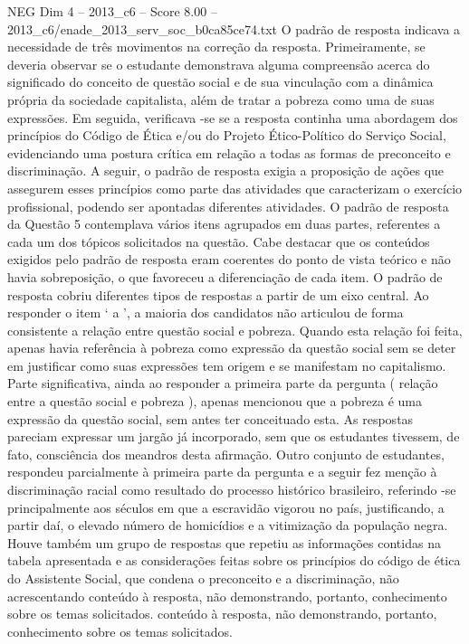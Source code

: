\begin{textsample}{NEG Dim 4 – 2013\_c6 – Score 8.00 – 2013\_c6/enade\_2013\_serv\_soc\_b0ca85ce74.txt}
O padrão de resposta indicava a necessidade de três movimentos na correção da resposta.
Primeiramente, se deveria observar se o estudante demonstrava alguma compreensão acerca do significado do conceito de questão social e de sua vinculação com a dinâmica própria da sociedade capitalista, além de tratar a pobreza como uma de suas expressões.
Em seguida, verificava -se se a resposta continha uma abordagem dos princípios do Código de Ética e/ou do Projeto Ético-Político do Serviço Social, evidenciando uma postura crítica em relação a todas as formas de preconceito e discriminação.
A seguir, o padrão de resposta exigia a proposição de ações que assegurem esses princípios como parte das atividades que caracterizam o exercício profissional, podendo ser apontadas diferentes atividades.
O padrão de resposta da Questão 5 contemplava vários itens agrupados em duas partes, referentes a cada um dos tópicos solicitados na questão.
Cabe destacar que os conteúdos exigidos pelo padrão de resposta eram coerentes do ponto de vista teórico e não havia sobreposição, o que favoreceu a diferenciação de cada item.
O padrão de resposta cobriu diferentes tipos de respostas a partir de um eixo central.
Ao responder o item ‘ a ’, a maioria dos candidatos não articulou de forma consistente a relação entre questão social e pobreza.
Quando esta relação foi feita, apenas havia referência à pobreza como expressão da questão social sem se deter em justificar como suas expressões tem origem e se manifestam no capitalismo.
Parte significativa, ainda ao responder a primeira parte da pergunta ( relação entre a questão social e pobreza ), apenas mencionou que a pobreza é uma expressão da questão social, sem antes ter conceituado esta.
As respostas pareciam expressar um jargão já incorporado, sem que os estudantes tivessem, de fato, consciência dos meandros desta afirmação.
Outro conjunto de estudantes, respondeu parcialmente à primeira parte da pergunta e a seguir fez menção à discriminação racial como resultado do processo histórico brasileiro, referindo -se principalmente aos séculos em que a escravidão vigorou no país, justificando, a partir daí, o elevado número de homicídios e a vitimização da população negra.
Houve também um grupo de respostas que repetiu as informações contidas na tabela apresentada e as considerações feitas sobre os princípios do código de ética do Assistente Social, que condena o preconceito e a discriminação, não acrescentando conteúdo à resposta, não demonstrando, portanto, conhecimento sobre os temas solicitados. conteúdo à resposta, não demonstrando, portanto, conhecimento sobre os temas solicitados.

\end{textsample}

